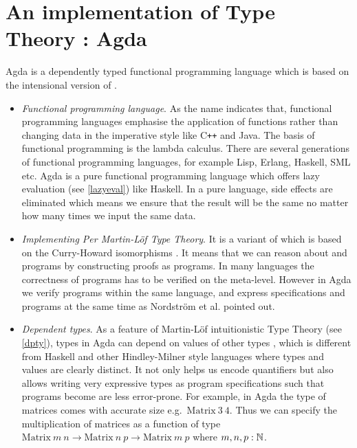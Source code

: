 \section{An implementation of Type Theory : Agda}

Agda is a dependently typed functional programming language which is based on the intensional version
of \mltt \cite{agdawiki:main}. 

\begin{itemize}

\item \textit{Functional programming language}. As the name indicates that, functional programming languages emphasise the application of functions rather than changing data in the imperative style like C{}\verb!++! and Java. The basis of functional programming is the lambda calculus. There are several generations of functional programming languages, for example Lisp, Erlang, Haskell, SML etc. 
Agda is a pure functional programming language which offers lazy evaluation (see \ref{lazyeval}) like Haskell. In a pure language, side effects are eliminated which means we ensure that the result will be the same no matter how many times we input the same data. 

\item \textit{Implementing Per Martin-L\"{o}f Type Theory}. It is a variant of \itt which is based on the Curry-Howard isomorphisms \cite{aboa}. It means that we can reason about \maths and programs by constructing proofs as programs. In many languages the correctness of programs has to be verified on the meta-level. However in Agda we verify programs within the same language, and express specifications and  programs at the same time as Nordström et al. \cite{nor:90} pointed out.


\item \textit{Dependent types}. 
As a feature of Martin-L\"{o}f intuitionistic Type Theory (see \ref{dpty}), types in Agda can depend on values of other types \cite{dtw}, which is different from Haskell and other Hindley-Milner style languages where types and values are clearly distinct. It not only helps us encode quantifiers but also allows writing very expressive types as program specifications such that programs become are less error-prone.
For example, in Agda the type of matrices comes with accurate size e.g.\ $\text{Matrix}~3~4$. Thus we can specify the multiplication of matrices as a function of type $\text{Matrix}~m~n \to \text{Matrix}~n~p \to \text{Matrix}~m~p$ where $m,n,p : \mathbb{N}$. 
\end{itemize}



